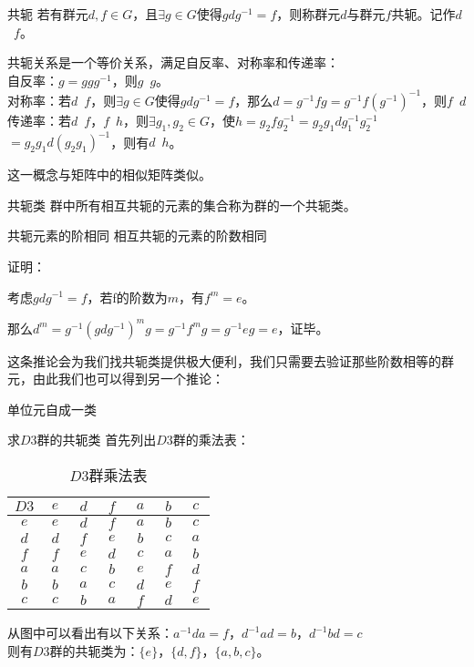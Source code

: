 
\begin{definition}{共轭}
若有群元$d,f\in G$，且$\exists g\in G$使得$gdg^{-1}=f$，则称群元$d$与群元$f$共轭。记作$d$~$f$。
\end{definition}

共轭关系是一个等价关系，满足自反率、对称率和传递率：\\
自反率：$g=ggg^{-1}$，则$g$~$g$。 \\
对称率：若$d$~$f$，则$\exists g\in G$使得$gdg^{-1}=f$，那么$d=g^{-1}fg=
g^{-1}f(g^{-1})^{-1}$，则$f$~$d$ \\
传递率：若$d$~$f$，$f$~$h$，则$\exists g_1,g_2\in G$，使$h=g_2fg_2^{-1}=
g_2g_1dg_1^{-1}g_2^{-1}$ $=g_2g_1d(g_2g_1)^{-1}$，则有$d$~$h$。

这一概念与矩阵中的相似矩阵类似。

\begin{definition}{共轭类}
群中所有相互共轭的元素的集合称为群的一个共轭类。
\end{definition}

\begin{corollary}{共轭元素的阶相同}
相互共轭的元素的阶数相同
\end{corollary}
证明： 

考虑$gdg^{-1}=f$，若f的阶数为$m$，有$f^m=e$。

那么$d^m=g^{-1}(gdg^{-1})^mg=g^{-1}f^mg=g^{-1}eg=e$，证毕。

这条推论会为我们找共轭类提供极大便利，我们只需要去验证那些阶数相等的群元，由此我们也可以得到另一个推论：
\begin{corollary}{}
单位元自成一类
\end{corollary}

\begin{example}{求$D3$群的共轭类}
首先列出$D3$群的乘法表：
\begin{table}[ht]
\centering
\caption{$D3$群乘法表}\label{gpcon_tab1}
\begin{tabular}{|c|c|c|c|c|c|c|}
\hline
        $D3$ & $~e~$ & $~d~$ & $~f~$ & $~a~$ & $~b~$ & $~c~$ \\ \hline
        $e$ & $e$ & $d$ & $f$ & $a$ & $b$ & $c$ \\ \hline
        $d$ & $d$ & $f$ & $e$ & $b$ & $c$ & $a$ \\ \hline
        $f$ & $f$ & $e$ & $d$ & $c$ & $a$ & $b$ \\ \hline
        $a$ & $a$ & $c$ & $b$ & $e$ & $f$ & $d$ \\ \hline
        $b$ & $b$ & $a$ & $c$ & $d$ & $e$ & $f$ \\ \hline
        $c$ & $c$ & $b$ & $a$ & $f$ & $d$ & $e$ \\ \hline
\end{tabular}
\end{table}

从图中可以看出有以下关系：$a^{-1}da=f$，$d^{-1}ad=b$，$d^{-1}bd=c$\\
则有$D3$群的共轭类为：$\{e\}$，$\{d,f\}$，$\{a,b,c\}$。
\end{example}